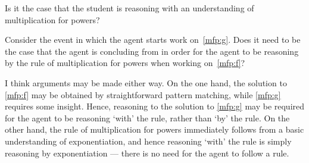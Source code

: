 \begin{note}
  \noindent%
  Is it the case that the student is reasoning with an understanding of multiplication for powers?

  Consider the event in which the agent starts work on~\ref{mfp:g}.
  Does it need to be the case that the agent is concluding  from  in order for the agent to be reasoning by the rule of multiplication for powers when working on~\ref{mfp:f}?

  I think arguments may be made either way.
  On the one hand, the solution to \ref{mfp:f} may be obtained by straightforward pattern matching, while \ref{mfp:g} requires some insight.
  Hence, reasoning to the solution to \ref{mfp:g} may be required for the agent to be reasoning `with' the rule, rather than `by' the rule.
  On the other hand, the rule of multiplication for powers immediately follows from a basic understanding of exponentiation, and hence reasoning `with' the rule is simply reasoning by exponentiation --- there is no need for the agent to follow a rule.
\end{note}

